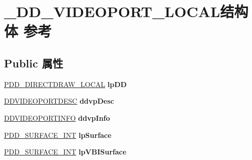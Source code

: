 \hypertarget{struct___d_d___v_i_d_e_o_p_o_r_t___l_o_c_a_l}{}\section{\+\_\+\+D\+D\+\_\+\+V\+I\+D\+E\+O\+P\+O\+R\+T\+\_\+\+L\+O\+C\+A\+L结构体 参考}
\label{struct___d_d___v_i_d_e_o_p_o_r_t___l_o_c_a_l}
\subsection*{Public 属性}
\begin{DoxyCompactItemize}
\item 
\mbox{\label{struct___d_d___v_i_d_e_o_p_o_r_t___l_o_c_a_l_a9360faf64cc3b8cbd3b826808353ef15}} 
\hyperlink{struct___d_d___d_i_r_e_c_t_d_r_a_w___l_o_c_a_l}{P\+D\+D\+\_\+\+D\+I\+R\+E\+C\+T\+D\+R\+A\+W\+\_\+\+L\+O\+C\+AL} {\bfseries lp\+DD}
\item 
\mbox{\label{struct___d_d___v_i_d_e_o_p_o_r_t___l_o_c_a_l_aa724f322fb3ae520e71ea261e9cc4b76}} 
\hyperlink{struct___d_d_v_i_d_e_o_p_o_r_t_d_e_s_c}{D\+D\+V\+I\+D\+E\+O\+P\+O\+R\+T\+D\+E\+SC} {\bfseries ddvp\+Desc}
\item 
\mbox{\label{struct___d_d___v_i_d_e_o_p_o_r_t___l_o_c_a_l_ad0cab1985331403b4a4ff7da45966a3e}} 
\hyperlink{struct___d_d_v_i_d_e_o_p_o_r_t_i_n_f_o}{D\+D\+V\+I\+D\+E\+O\+P\+O\+R\+T\+I\+N\+FO} {\bfseries ddvp\+Info}
\item 
\mbox{\label{struct___d_d___v_i_d_e_o_p_o_r_t___l_o_c_a_l_accc120515bebf36a65064334a3125ef0}} 
\hyperlink{struct___d_d___s_u_r_f_a_c_e___i_n_t}{P\+D\+D\+\_\+\+S\+U\+R\+F\+A\+C\+E\+\_\+\+I\+NT} {\bfseries lp\+Surface}
\item 
\mbox{\label{struct___d_d___v_i_d_e_o_p_o_r_t___l_o_c_a_l_a0447b40894679c9c5eb7714a8e07aed2}} 
\hyperlink{struct___d_d___s_u_r_f_a_c_e___i_n_t}{P\+D\+D\+\_\+\+S\+U\+R\+F\+A\+C\+E\+\_\+\+I\+NT} {\bfseries lp\+V\+B\+I\+Surface}
\item 
\mbox{\label{struct___d_d___v_i_d_e_o_p_o_r_t___l_o_c_a_l_afaeeb1bec4d552645e6b89a6291724f9}} 

\end{DoxyCompactItemize}
